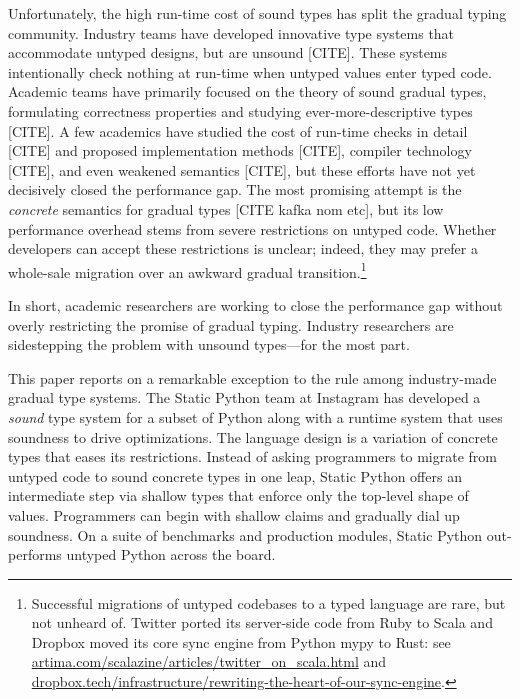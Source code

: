 \documentclass[english,cleveref,submission]{programming}
\newcommand{\shorturl}[2]{\href{#1#2}{#2}}
\newcommand{\SP}{Static Python}
\begin{document}
Unfortunately, the high run-time cost of sound types has split
the gradual typing community.
Industry teams have developed innovative type systems that accommodate
untyped designs, but are unsound [CITE].
These systems intentionally check nothing at run-time when untyped values enter
typed code.
Academic teams have primarily focused on the theory of sound
gradual types, formulating correctness properties and studying ever-more-descriptive types [CITE].
A few academics have studied the cost of run-time checks
in detail [CITE] and proposed implementation methods [CITE],
compiler technology [CITE],
and even weakened semantics [CITE], but these efforts have not yet
decisively closed the performance gap.
The most promising attempt is the \emph{concrete} semantics
for gradual types [CITE kafka nom etc], but its low performance
overhead stems from severe restrictions on untyped code.
Whether developers can accept these restrictions is unclear;
indeed, they may prefer a whole-sale migration over an awkward
gradual transition.\footnote{Successful migrations of untyped codebases
to a typed language are rare, but not unheard of.
Twitter ported its server-side code from Ruby to Scala
and Dropbox moved its core sync engine from Python mypy to Rust: see
\shorturl{http://www.}{artima.com/scalazine/articles/twitter\_on\_scala.html} and
\shorturl{https://}{dropbox.tech/infrastructure/rewriting-the-heart-of-our-sync-engine}.}

In short, academic researchers are working to close the performance gap
without overly restricting the promise of gradual typing.
Industry researchers are sidestepping the problem with unsound types---for the most part.

This paper reports on a remarkable exception to the rule among industry-made gradual type systems.
The \SP{} team at Instagram has developed a \emph{sound} type system for a subset of
Python along with a runtime system that uses soundness to drive optimizations.
The language design is a variation of concrete types that eases its restrictions.
Instead of asking programmers to migrate from untyped code to sound concrete types
in one leap, \SP{} offers an intermediate step via shallow types that enforce
only the top-level shape of values.
Programmers can begin with shallow claims and gradually dial up soundness.
On a suite of benchmarks and production modules, Static Python out-performs untyped
Python across the board.
\end{document}
